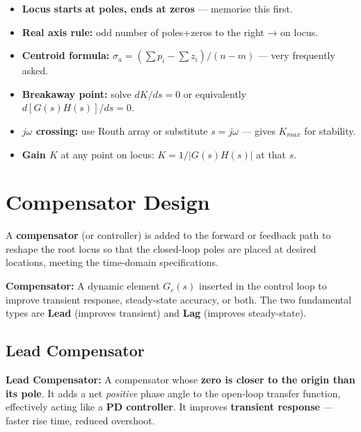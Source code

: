 \documentclass[12pt,a4paper]{article}
\begin{document}
\begin{tcolorbox}[exambox, title={Exam Tips — Root Locus}]
\begin{itemize}[leftmargin=*, itemsep=3pt, topsep=0pt]
  \item \textbf{Locus starts at poles, ends at zeros} — memorise this first.
  \item \textbf{Real axis rule:} odd number of poles+zeros to the right → on locus.
  \item \textbf{Centroid formula:} $\sigma_a = (\sum p_i - \sum z_i)/(n-m)$ — very frequently asked.
  \item \textbf{Breakaway point:} solve $dK/ds = 0$ or equivalently $d[G(s)H(s)]/ds = 0$.
  \item \textbf{$j\omega$ crossing:} use Routh array or substitute $s=j\omega$ — gives $K_{max}$ for stability.
  \item \textbf{Gain $K$} at any point on locus: $K = 1/|G(s)H(s)|$ at that $s$.
\end{itemize}
\end{tcolorbox}

\section{Compensator Design}

A \textbf{compensator} (or controller) is added to the forward or feedback path to reshape the root locus so that the closed-loop poles are placed at desired locations, meeting the time-domain specifications.

\begin{tcolorbox}[defbox]
\textbf{Compensator:} A dynamic element $G_c(s)$ inserted in the control loop to improve transient response, steady-state accuracy, or both. The two fundamental types are \textbf{Lead} (improves transient) and \textbf{Lag} (improves steady-state).
\end{tcolorbox}

\subsection{Lead Compensator}

\begin{tcolorbox}[defbox]
\textbf{Lead Compensator:} A compensator whose \textbf{zero is closer to the origin than its pole}. It adds a net \textit{positive} phase angle to the open-loop transfer function, effectively acting like a \textbf{PD controller}. It improves \textbf{transient response} — faster rise time, reduced overshoot.
\end{tcolorbox}
\end{document}
